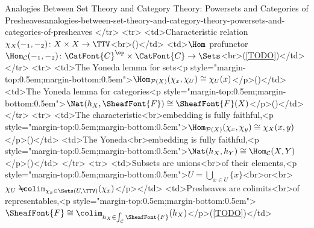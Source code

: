 \begin{remark}{Analogies Between Set Theory and Category Theory: Powersets and Categories of Presheaves}{analogies-between-set-theory-and-category-theory-powersets-and-categories-of-presheaves}
          </tr>
          <tr>
          <td>Characteristic relation $\chi_{X}(-_{1},-_{2})\colon X\times X\to\TTV$<br>()</td>
          <td>$\Hom$ profunctor $\Hom_{\mathcal{C}}(-_{1},-_{2})\colon\CatFont{C}^{\op}\times\CatFont{C}\to\Sets$<br>(\cref{TODO})</td>
          </tr>
          <tr>
          <td>The Yoneda lemma for sets<p style="margin-top:0.5em;margin-bottom:0.5em">$\Hom_{\mathcal{P}(X)}(\chi_{x},\chi_{U})\cong\chi_{U}(x)$</p>()</td>
            <td>The Yoneda lemma for categories<p style="margin-top:0.5em;margin-bottom:0.5em">$\Nat(h_{X},\SheafFont{F})\cong\SheafFont{F}(X)$</p>()</td>
          </tr>
          <tr>
            <td>The characteristic<br>embedding is fully faithful,<p style="margin-top:0.5em;margin-bottom:0.5em">$\Hom_{\mathcal{P}(X)}(\chi_{x},\chi_{y})\cong\chi_{X}(x,y)$</p>()</td>
            <td>The Yoneda<br>embedding is fully faithful,<p style="margin-top:0.5em;margin-bottom:0.5em">$\Nat(h_{X},h_{Y})\cong\Hom_{\mathcal{C}}(X,Y)$</p>()</td>
          </tr>
          <tr>
            <td>Subsets are unions<br>of their elements,<p style="margin-top:0.5em;margin-bottom:0.5em">$\displaystyle U=\bigcup_{x\in U}\{x\}$<br>or<br>$\displaystyle\chi_{U}=\mkern-18mu\colim_{\chi_{x}\in\Sets(U,\TTV)}(\chi_{x})$</p></td>
            <td>Presheaves are colimits<br>of representables,<p style="margin-top:0.5em;margin-bottom:0.5em">$\displaystyle\SheafFont{F}\cong\colim_{h_{X}\in\int_{\mathcal{C}}\SheafFont{F}}(h_{X})$</p>(\cref{TODO})</td>

\end{remark}

